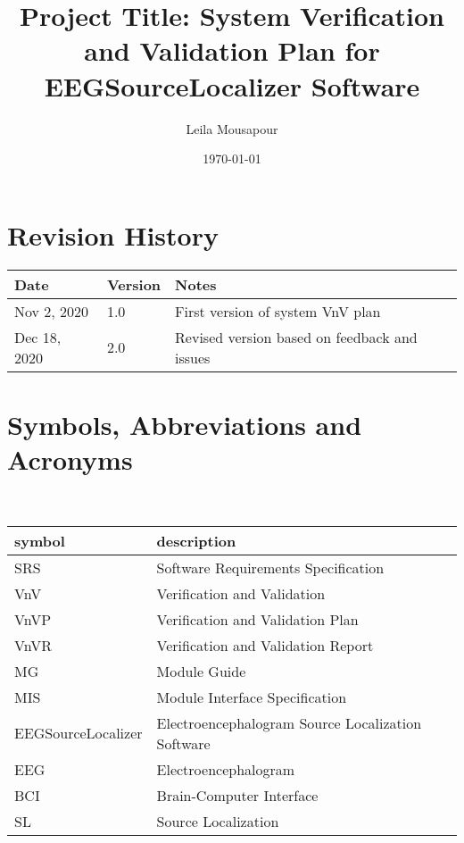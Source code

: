 \documentclass[12pt, titlepage]{article}
\renewcommand{\progname}{EEGSourceLocalizer}
\begin{document}
\title{Project Title: System Verification and Validation Plan for \progname{} Software} 
\author{Leila Mousapour}
\date{\today}
	
\maketitle


\section{Revision History}

\begin{tabularx}{\textwidth}{p{3cm}p{2cm}X}
\toprule {\bf Date} & {\bf Version} & {\bf Notes}\\
\midrule
Nov 2, 2020 & 1.0 & First version of system VnV plan\\
Dec 18, 2020 & 2.0 & Revised version based on feedback and issues\\
\bottomrule
\end{tabularx}

\newpage

\tableofcontents

\listoftables


\newpage

\section{Symbols, Abbreviations and Acronyms}


~\newline
\renewcommand{\arraystretch}{1.2}
\begin{tabular}{l l} 
\toprule		
\textbf{symbol} & \textbf{description}\\
\midrule 
SRS & Software Requirements Specification\\
VnV & Verification and Validation\\
VnVP & Verification and Validation Plan\\
VnVR & Verification and Validation Report\\
MG& Module Guide\\
MIS& Module Interface Specification\\
EEGSourceLocalizer & Electroencephalogram Source Localization Software\\ 
EEG & Electroencephalogram \\
BCI & Brain-Computer Interface\\
SL & Source Localization \\
\bottomrule
\end{tabular}\\
\end{document}
